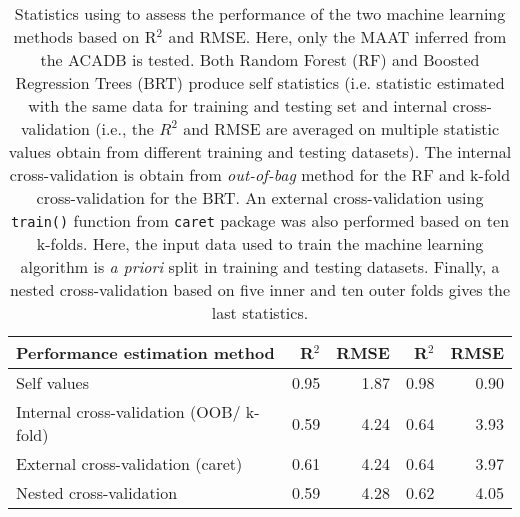 \begin{table}[ht]
\centering
\caption{Statistics using to assess the performance of the two machine learning methods based on R$^2$ and RMSE. Here, only the MAAT inferred from the ACADB is tested. Both Random Forest (RF) and Boosted Regression Trees (BRT) produce self statistics (i.e. statistic estimated with the same data for training and testing set and internal cross-validation (i.e., the $R^2$ and RMSE are averaged on multiple statistic values obtain from different training and testing datasets). The internal cross-validation is obtain from \textit{out-of-bag} method for the RF and k-fold cross-validation for the BRT. An external cross-validation using \texttt{train()} function from \texttt{caret} package was also performed based on ten k-folds. Here, the input data used to train the machine learning algorithm is \textit{a priori} split in training and testing datasets. Finally, a nested cross-validation based on five inner and ten outer folds gives the last statistics.} 
\label{FT_table}
\begin{tabular}{lrrrr}
  \toprule
\textbf{Performance estimation method} & R$^2$ & RMSE & R$^2$ & RMSE \\ 
  \midrule
Self values & 0.95 & 1.87 & 0.98 & 0.90 \\ 
  Internal cross-validation (OOB/ k-fold) & 0.59 & 4.24 & 0.64 & 3.93 \\ 
  External cross-validation (caret) & 0.61 & 4.24 & 0.64 & 3.97 \\ 
  Nested cross-validation & 0.59 & 4.28 & 0.62 & 4.05 \\ 
   \bottomrule
\end{tabular}
\end{table}
